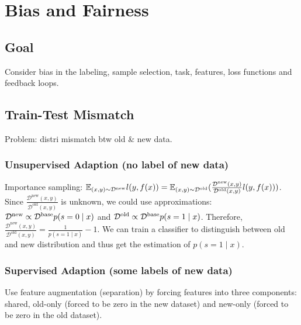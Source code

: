 \section{Bias and Fairness}

\subsection*{Goal}

Consider bias in the labeling, sample selection, task, features, loss functions and feedback loops.

\subsection*{Train-Test Mismatch}

Problem: distri mismatch btw old \& new data.

\subsubsection*{Unsupervised Adaption (no label of new data)}
Importance sampling: $\mathbb{E}_{(x,y)\sim \mathcal{D}^{\text{new}}} l(y, f(x)) = \mathbb{E}_{(x,y)\sim \mathcal{D}^{\text{old}}} (\frac{\mathcal{D}^{\text{new}}(x,y)}{\mathcal{D}^{\text{old}}(x,y)}l(y,f(x)))$. Since $\frac{\mathcal{D}^{\text{new}}(x,y)}{\mathcal{D}^{\text{old}}(x,y)}$ is unknown, we could use approximations: $\mathcal{D}^{\text{new}} \propto \mathcal{D}^{\text{base}}p(s=0\mid x)$ and $\mathcal{D}^{\text{old}} \propto \mathcal{D}^{\text{base}}p(s=1\mid x)$. Therefore, $\frac{\mathcal{D}^{\text{new}}(x,y)}{\mathcal{D}^{\text{old}}(x,y)} = \frac{1}{p(s=1\mid x)}-1$. We can train a classifier to distinguish between old and new distribution and thus get the estimation of $p(s=1\mid x)$.

\subsubsection*{Supervised Adaption (some labels of new data)}

Use feature augmentation (separation) by forcing features into three components: shared, old-only (forced to be zero in the new dataset) and new-only (forced to be zero in the old dataset).
